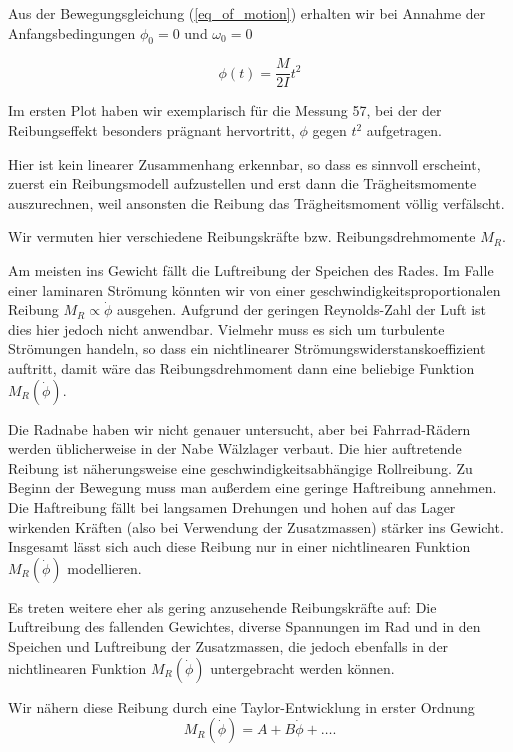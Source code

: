 \documentclass[a4paper,german,12pt,smallheadings]{scrartcl}
\begin{document}
Aus der Bewegungsgleichung (\ref{eq_of_motion}) erhalten wir bei
Annahme der Anfangsbedingungen $\phi_0 = 0$ und $\omega_0 = 0$

\begin{equation}
  \phi(t) = \frac{M}{2I} t^2
\end{equation}

Im ersten Plot haben wir exemplarisch für die Messung 57, bei der der Reibungseffekt
besonders prägnant hervortritt, $\phi$ gegen $t^2$ aufgetragen.

Hier ist kein linearer Zusammenhang erkennbar, so dass es sinnvoll erscheint,
zuerst ein Reibungsmodell aufzustellen und erst dann die Trägheitsmomente
auszurechnen, weil ansonsten die Reibung das Trägheitsmoment völlig verfälscht.

Wir vermuten hier verschiedene Reibungskräfte bzw. Reibungsdrehmomente $M_R$.

Am meisten ins Gewicht fällt die Luftreibung der Speichen des Rades. Im Falle
einer laminaren Strömung könnten wir von einer geschwindigkeitsproportionalen
Reibung $M_R \propto \dot{\phi}$ ausgehen.  Aufgrund der geringen Reynolds-Zahl
der Luft ist dies hier jedoch nicht anwendbar. Vielmehr muss es sich um
turbulente Strömungen handeln, so dass ein nichtlinearer
Strömungswiderstanskoeffizient auftritt, damit wäre das Reibungsdrehmoment dann
eine beliebige Funktion $M_R(\dot{\phi})$.

Die Radnabe haben wir nicht genauer untersucht, aber bei Fahrrad-Rädern werden
üblicherweise in der Nabe Wälzlager verbaut. Die hier auftretende Reibung ist
näherungsweise eine geschwindigkeitsabhängige Rollreibung. Zu Beginn der
Bewegung muss man außerdem eine geringe Haftreibung annehmen. Die Haftreibung
fällt bei langsamen Drehungen und hohen auf das Lager wirkenden Kräften (also
bei Verwendung der Zusatzmassen) stärker ins Gewicht. Insgesamt lässt sich auch
diese Reibung nur in einer nichtlinearen Funktion $M_R(\dot{\phi})$
modellieren.

Es treten weitere eher als gering anzusehende Reibungskräfte auf: Die
Luftreibung des fallenden Gewichtes, diverse Spannungen im Rad und in den
Speichen und Luftreibung der Zusatzmassen, die jedoch ebenfalls in der
nichtlinearen Funktion $M_R(\dot{\phi})$ untergebracht werden können.

Wir nähern diese Reibung durch eine Taylor-Entwicklung in erster Ordnung
\begin{equation}
  M_R(\dot{\phi}) = A + B \dot{\phi} + \dots.
\end{equation}
\end{document}

